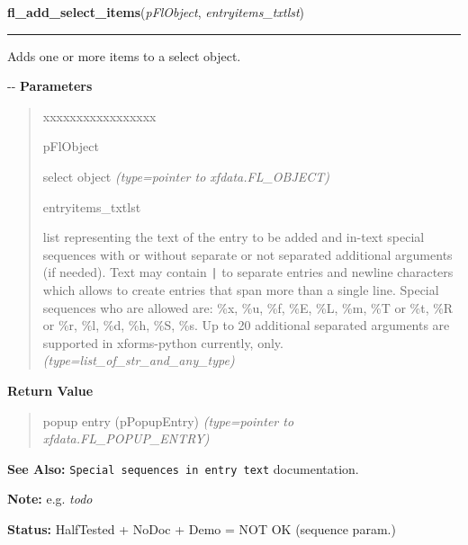 \hspace{.8\funcindent}\begin{boxedminipage}{\funcwidth}

    \raggedright \textbf{fl\_add\_select\_items}(\textit{pFlObject}, \textit{entryitems\_txtlst})

    \vspace{-1.5ex}

    \rule{\textwidth}{0.5\fboxrule}
\setlength{\parskip}{2ex}

Adds one or more items to a select object.

-{}-
\setlength{\parskip}{1ex}
      \textbf{Parameters}
      \vspace{-1ex}

      \begin{quote}
        \begin{Ventry}{xxxxxxxxxxxxxxxxx}

          \item[pFlObject]


select object
            {\it (type=pointer to xfdata.FL\_OBJECT)}

          \item[entryitems\_txtlst]


list representing the text of the entry to be added and in-text
special sequences with or without separate or not separated additional
arguments (if needed). Text may contain \texttt{|} to separate entries and
newline characters which allows to create entries that span more than
a single line. Special sequences who are allowed are: \%x, \%u, \%f, \%E,
\%L, \%m, \%T or \%t, \%R or \%r, \%l, \%d, \%h, \%S, \%s. Up to 20 additional
separated arguments are supported in xforms-python currently, only.
            {\it (type=list\_of\_str\_and\_any\_type)}

        \end{Ventry}

      \end{quote}

      \textbf{Return Value}
    \vspace{-1ex}

      \begin{quote}

popup entry (pPopupEntry)
      {\it (type=pointer to xfdata.FL\_POPUP\_ENTRY)}

      \end{quote}

\textbf{See Also:} 
\texttt{Special sequences in entry text} documentation.


\textbf{Note:} 
e.g. \emph{todo}


\textbf{Status:} 
HalfTested + NoDoc + Demo = NOT OK (sequence param.)


    \end{boxedminipage}

